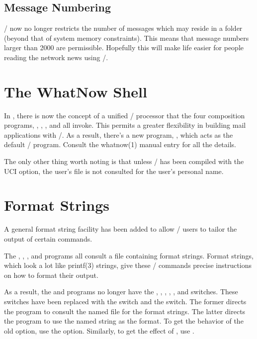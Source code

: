 \subsection*	{Message Numbering}
\MH/ now no longer restricts the number of messages which may reside in a
folder
(beyond that of system memory constraints).
This means that message numbers larger than 2000 are permissible.
Hopefully this will make life easier for people reading the network news
using \MH/.

\section*	{The WhatNow Shell}
In ,
there is now the concept of a unified \whatnow/ processor that
the four composition programs, , , ,
and  all invoke.
This permits a greater flexibility in building mail applications with \MH/.
As a result, there's a new program, , which acts as the default
\whatnow/ program.
Consult the \man whatnow(1) manual entry for all the details.

The only other thing worth noting is that unless \MH/ has been compiled with
the UCI option,
the user's  file is not consulted for the user's
personal name.

\section*	{Format Strings}
A general format string facility has been added to allow \MH/ users to tailor
the output of certain commands.

The , , , and  programs all consult a
file containing format strings.
Format strings,
which look a lot like \man printf(3) strings,
give these \MH/ commands precise instructions on how to format their output.

As a result,
the  and  programs no longer have the
, ,
, ,
, and 
switches.
These switches have been replaced with the
 switch and the  switch.
The former directs the program to consult the named file for the format
strings.
The latter directs the program to use the named string as the format.
To get the behavior of the old  option,
use the  option.
Similarly,
to get the effect of ,
use .

